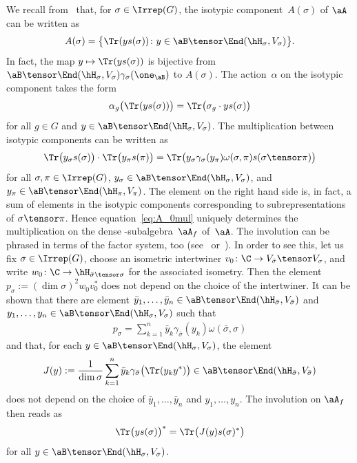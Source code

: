 We recall from~\cite{SchWa17c} that, for $\sigma \in \Irrep(G)$, the isotypic component~$A(\sigma)$ of $\aA$ can be written as
\begin{gather*}
	A(\sigma) = \bigl\{ \Tr ( y s(\sigma) )\colon y \in \aB \tensor \End(\hH_\sigma, V_\sigma) \bigr\}.
\end{gather*}
In fact, the map $y \mapsto \Tr ( y s(\sigma) )$ is bijective from $\aB \tensor \End(\hH_\sigma, V_\sigma) \gamma_\sigma(\one_\aB)$ to $A(\sigma)$.
The action~$\alpha$ on the isotypic component takes the form
\begin{gather}
	\alpha_g \bigl( \Tr ( ys(\sigma) ) \bigr) = \Tr\bigl( \sigma_g \cdot ys(\sigma) \bigr)\label{eq:A_0action}
\end{gather}
for all $g \in G$ and $y \in \aB \tensor \End(\hH_\sigma,V_\sigma)$.
The multiplication between isotypic components can be written as
	\begin{gather}
		\Tr \bigl( y_\sigma s(\sigma) \bigr) \cdot \Tr \bigl( y_\pi s(\pi) \bigr)
		=
		\Tr \bigl( y_\sigma \gamma_\sigma(y_\pi) \omega(\sigma, \pi) s(\sigma \tensor \pi) \bigr)\label{eq:A_0mul}
	\end{gather}
	for all $\sigma, \pi \in \Irrep(G)$, $y_\sigma \in \aB \tensor \End(\hH_\sigma, V_\sigma)$, and $y_\pi \in \aB \tensor \End(\hH_\pi, V_\pi)$.
The element on the right hand side is, in fact, a sum of elements in the isotypic components corresponding to subrepresentations of $\sigma \tensor \pi$.
Hence equation~\eqref{eq:A_0mul} uniquely determines the multiplication on the dense \Star-subalgebra~$\aA_f$ of~$\aA$.
The involution can be phrased in terms of the factor system, too (see~\cite[Section~5]{SchWa17c} or~\cite[Lemma~2.4]{Ne13}).
In order to see this, let us fix $\sigma \in \Irrep(G)$, choose an isometric intertwiner $v_0\colon \C \to V_{\bar\sigma} \tensor V_\sigma$, and write $w_0\colon \C \to \hH_{\bar\sigma \tensor \sigma}$ for the associated isometry.
Then the element $p_\sigma := (\dim \sigma)^2 w_0^{}v_0^*$ does not depend on the choice of the intertwiner.
It can be shown that there are element $\bar y_1, \dots, \bar y_n \in \aB \tensor \End(\hH_{\bar\sigma}, V_{\bar\sigma})$ and $y_1, \dots, y_n \in \aB \tensor \End(\hH_\sigma, V_\sigma)$ such that
\begin{gather}
	\label{eq:involution_decomposition}
	p_\sigma = \sum_{k=1}^n \bar y_k \gamma_{\bar\sigma}(y_k) \omega(\bar \sigma, \sigma)
\end{gather}
and that, for each $y \in \aB \tensor \End(\hH_\sigma, V_\sigma)$, the element
\begin{gather*}
	J(y) := \frac{1}{\dim \sigma}\sum_{k=1}^n \bar y_k \gamma_{\bar\sigma} \bigl( \Tr(y_k y^*) \bigr) \in \aB \tensor \End(\hH_{\bar\sigma}, V_{\bar \sigma})
\end{gather*}
does not depend on the choice of $\bar y_1, \dots, \bar y_n$ and $y_1, \dots, y_n$.
The involution on $\aA_f$ then reads as
\begin{gather*}
	\Tr \bigl( y s(\sigma) \bigr)^* = \Tr \bigl( J(y) s(\sigma)^* \bigr)
\end{gather*}
for all $y \in \aB \tensor \End(\hH_\sigma, V_\sigma)$.

